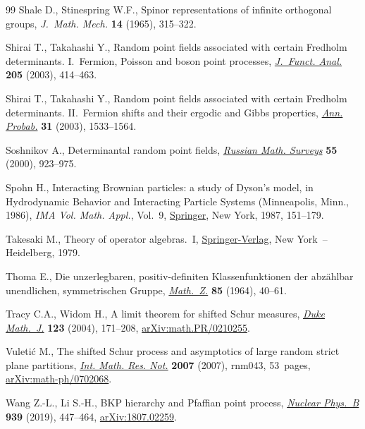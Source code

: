 \documentclass[pdftex]{sigma}
\numberwithin{equation}{section}
\begin{document}
\begin{thebibliography}{99}
Shale D., Stinespring W.F., Spinor representations of infinite orthogonal
 groups, \textit{J.~Math. Mech.} \textbf{14} (1965), 315--322.

Shirai T., Takahashi Y., Random point fields associated with certain {F}redholm
 determinants. {I}.~{F}ermion, {P}oisson and boson point processes,
 \href{https://doi.org/10.1016/S0022-1236(03)00171-X}{\textit{J.~Funct. Anal.}} \textbf{205} (2003), 414--463.

Shirai T., Takahashi Y., Random point fields associated with certain {F}redholm
 determinants. {II}.~{F}ermion shifts and their ergodic and {G}ibbs
 properties, \href{https://doi.org/10.1214/aop/1055425789}{\textit{Ann. Probab.}} \textbf{31} (2003), 1533--1564.

Soshnikov A., Determinantal random point fields, \href{https://doi.org/10.1070/rm2000v055n05ABEH000321}{\textit{Russian Math. Surveys}}
 \textbf{55} (2000), 923--975.

Spohn H., Interacting {B}rownian particles: a study of {D}yson's model, in
 Hydrodynamic Behavior and Interacting Particle Systems ({M}inneapolis,
 {M}inn., 1986), \textit{IMA Vol. Math. Appl.}, Vol.~9, \href{https://doi.org/10.1007/978-1-4684-6347-7_13}{Springer}, New York,
 1987, 151--179.

Takesaki M., Theory of operator algebras.~{I}, \href{https://doi.org/10.1007/978-1-4612-6188-9}{Springer-Verlag}, New York~--
 Heidelberg, 1979.

Thoma E., Die unzerlegbaren, positiv-definiten {K}lassenfunktionen der
 abz\"ahlbar unendlichen, symmetrischen {G}ruppe, \href{https://doi.org/10.1007/BF01114877}{\textit{Math.~Z.}}
 \textbf{85} (1964), 40--61.

Tracy C.A., Widom H., A limit theorem for shifted {S}chur measures,
 \href{https://doi.org/10.1215/S0012-7094-04-12316-4}{\textit{Duke Math.~J.}} \textbf{123} (2004), 171--208,
 \href{https://arxiv.org/abs/math.PR/0210255}{arXiv:math.PR/0210255}.

Vuleti\'c M., The shifted {S}chur process and asymptotics of large random
 strict plane partitions, \href{https://doi.org/10.1093/imrn/rnm043}{\textit{Int. Math. Res. Not.}} \textbf{2007} (2007),
 rnm043, 53~pages, \href{https://arxiv.org/abs/math-ph/0702068}{arXiv:math-ph/0702068}.

Wang Z.-L., Li S.-H., B{KP} hierarchy and {P}faffian point process,
 \href{https://doi.org/10.1016/j.nuclphysb.2018.12.028}{\textit{Nuclear Phys.~B}} \textbf{939} (2019), 447--464, \href{https://arxiv.org/abs/1807.02259}{arXiv:1807.02259}.

\end{thebibliography}\LastPageEnding
\end{document}
